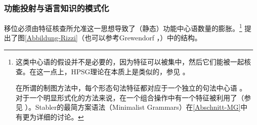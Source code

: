 \subsubsection{功能投射与语言知识的模式化}

移位必须由特征核查所允准这一思想导致了（静态）功能中心语数量的膨胀。\footnote{%
这类中心语的假设并不是必要的，因为特征可以被集中，然后它们能被一起核查。在这一点上，HPSG\indexhpsg 理论在本质上是类似的，参见 。

在所谓的制图方法中，每个形态句法特征都对应于一个独立的句法中心语 \citep[, 61]{CR2010a}。对于一个明显形式化的方法来说，在一个组合操作中有一个特征被利用了（参见 ）。Stabler的最简方案语法（Minimalist Grammars）\indexmg 在\ref{Abschnitt-MG}中有更为详细的讨论。
}
 \citet[]{Rizzi97a-u}提出了图\vref{Abbildung-Rizzi}（也可以参考Grewendorf \citeyear[, 240]{Grewendorf2002a}，\citeyear{Grewendorf2009a}）中的结构。



